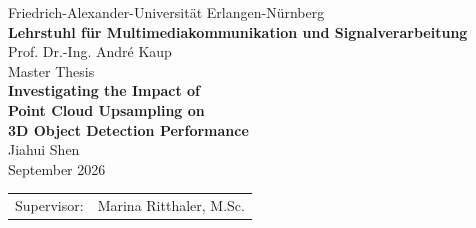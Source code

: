 \begin{titlepage}
    \vspace*{6ex}
    \begin{center}
        \LARGE
        Friedrich-Alexander-Universität Erlangen-Nürnberg\\[1.5ex]
        \Large
        \textbf{Lehrstuhl für Multimediakommunikation und Signalverarbeitung}\\[1.5ex]
        Prof. Dr.-Ing. André Kaup\\
        \vfill
        \LARGE
        Master Thesis\\[3ex]
        \textbf{Investigating the Impact of\\Point Cloud Upsampling on\\3D Object Detection Performance}\\[3ex]
        Jiahui Shen\\
        \vfill
        \Large
        September 2026\\[1.5ex]
        \begin{tabular}{ll}
            Supervisor: & Marina Ritthaler, M.Sc.
        \end{tabular}
    \end{center}
\end{titlepage}
